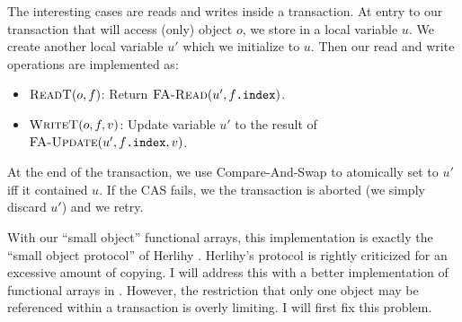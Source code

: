 The interesting cases are reads and writes inside a transaction.
At entry to our transaction that will access (only) object $o$, we
store  in a local variable $u$.  We create another
local variable $u'$ which we initialize to $u$.  Then our read and
write operations are implemented as:
\begin{itemize}
\item $\text{\sc ReadT}(o, f)$:
  Return $\text{\sc FA-Read}(u', f\text{\tt .index})$.
\item $\text{\sc WriteT}(o, f, v)$:
  Update variable $u'$ to the result of \linebreak
  $\text{\sc FA-Update}(u', f\text{\tt .index}, v)$.
\end{itemize}

At the end of the transaction, we use Compare-And-Swap to atomically
set  to $u'$ iff it contained $u$.  If the CAS fails,
we the transaction is aborted (we simply discard $u'$) and we retry.

With our \naive ``small object'' functional arrays, this implementation is
exactly the ``small object protocol'' of Herlihy \cite{Herlihy93}.
Herlihy's protocol is rightly criticized for an excessive amount of
copying.  I will address this with a better implementation of
functional arrays in .
However, the restriction that only one object
may be referenced within a transaction is overly limiting.  I will
first fix this problem.

